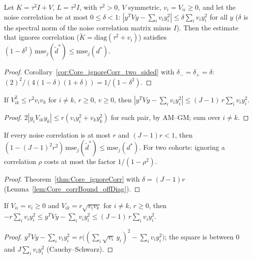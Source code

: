 \begin{theorem}\label{thm:Core_ignoreCorr}
  \leanok
  Let $K = \tau^2I + V$, $L = \tau^2I$, with $\tau^2 > 0$, $V$ symmetric, $v_i = V_{ii} \ge 0$,
  and let the noise correlation be at most $0 \le \delta < 1$:
  $|y^TVy - \sum_i v_iy_i^2| \le \delta\sum_i v_iy_i^2$ for all $y$ ($\delta$ is the
  spectral norm of the noise correlation matrix minus $I$). Then the estimate that
  ignores correlation ($\tilde K = \mathrm{diag}(\tau^2 + v_i)$) satisfies
  $(1-\delta^2)\,\mathrm{mse}_j(\tilde d^*) \le \mathrm{mse}_j(d^*)$.
\end{theorem}
\begin{proof}
  \leanok
  Corollary~\ref{cor:Core_ignoreCorr_two_sided} with $\delta_- = \delta_+ = \delta$:
  $(2)^2/(4(1-\delta)(1+\delta)) = 1/(1-\delta^2)$.
\end{proof}

\begin{lemma}\label{lem:Core_corrBound_offDiag}
  \leanok
  If $V_{ik}^2 \le r^2v_iv_k$ for $i \ne k$, $r \ge 0$, $v \ge 0$, then
  $|y^TVy - \sum_i v_iy_i^2| \le (J-1)\,r\sum_i v_iy_i^2$.
\end{lemma}
\begin{proof}
  \leanok
  $2|y_iV_{ik}y_k| \le r(v_iy_i^2 + v_ky_k^2)$ for each pair, by AM--GM; sum over $i \ne k$.
\end{proof}

\begin{corollary}\label{cor:Core_ignoreCorr_offDiag}
  \leanok
  If every noise correlation is at most $r$ and $(J-1)r < 1$, then
  $(1 - (J-1)^2r^2)\,\mathrm{mse}_j(\tilde d^*) \le \mathrm{mse}_j(d^*)$. For two cohorts:
  ignoring a correlation $\rho$ costs at most the factor $1/(1-\rho^2)$.
\end{corollary}
\begin{proof}
  \leanok
  Theorem~\ref{thm:Core_ignoreCorr} with $\delta = (J-1)r$ (Lemma~\ref{lem:Core_corrBound_offDiag}).
\end{proof}

\begin{lemma}\label{lem:Core_equicorr}
  \leanok
  If $V_{ii} = v_i \ge 0$ and $V_{ik} = r\sqrt{v_iv_k}$ for $i \ne k$, $r \ge 0$, then
  $-r\sum_i v_iy_i^2 \le y^TVy - \sum_i v_iy_i^2 \le (J-1)\,r\sum_i v_iy_i^2$.
\end{lemma}
\begin{proof}
  \leanok
  $y^TVy - \sum_i v_iy_i^2 = r\bigl((\sum_i\sqrt{v_i}\,y_i)^2 - \sum_i v_iy_i^2\bigr)$;
  the square is between $0$ and $J\sum_i v_iy_i^2$ (Cauchy--Schwarz).
\end{proof}

